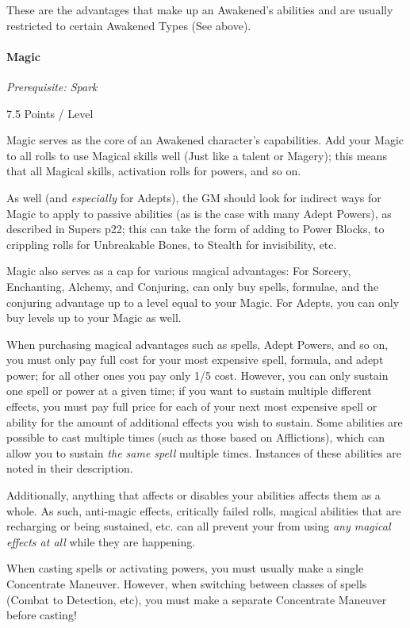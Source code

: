 \begin{multicols}{3}
	These are the advantages that make up an Awakened's abilities and are usually restricted to certain Awakened Types (See above).
	
	\paragraph{Magic}\label{magic}
	\textit{Prerequisite: Spark}
	\begin{flushright}
		7.5 Points / Level
	\end{flushright}
	
	Magic serves as the core of an Awakened character's capabilities. Add your Magic to all rolls to use Magical skills well (Just like a talent or Magery); this means that all Magical skills, activation rolls for powers, and so on. 
	
	As well (and \textit{especially} for Adepts), the GM should look for indirect ways for Magic to apply to passive abilities (as is the case with many Adept Powers), as described in \GURPS Supers p22; this can take the form of adding to Power Blocks, to crippling rolls for Unbreakable Bones, to Stealth for invisibility, etc. 
	
	Magic also serves as a cap for various magical advantages: For Sorcery, Enchanting, Alchemy, and Conjuring, can only buy spells, formulae, and the conjuring advantage up to a level equal to your Magic. For Adepts, you can only buy levels up to your Magic as well.
	
	When purchasing magical advantages such as spells, Adept Powers, and so on, you must only pay full cost for your most expensive spell, formula, and adept power; for all other ones you pay only 1/5 cost. However, you can only sustain one spell or power at a given time; if you want to sustain multiple different effects, you must pay full price for each of your next most expensive spell or ability for the amount of additional effects you wish to sustain. Some abilities are possible to cast multiple times (such as those based on Afflictions), which can allow you to sustain \textit{the same spell} multiple times. Instances of these abilities are noted in their description.
	
	Additionally, anything that affects or disables your abilities affects them as a whole. As such, anti-magic effects, critically failed rolls, magical abilities that are recharging or being sustained, etc. can all prevent your from using \textit{any magical effects at all} while they are happening.
	
	When casting spells or activating powers, you must usually make a single Concentrate Maneuver. However, when switching between classes of spells (Combat to Detection, etc), you must make a separate Concentrate Maneuver before casting!
	

\end{multicols}

